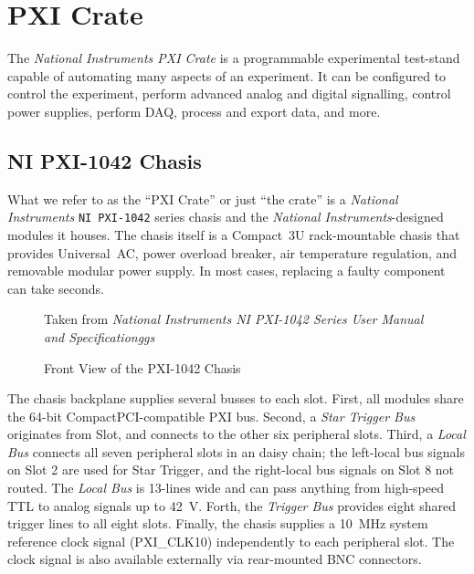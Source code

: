 \section{PXI Crate}
\label{sec:eq_pxi}

The \textit{National Instruments \gls{PXI Crate}} is a programmable experimental test-stand capable of automating many aspects of an experiment.  It can be configured to control the experiment, perform advanced analog and digital signalling, control power supplies, perform \gls{DAQ}, process and export data, and more.

\subsection{NI PXI-1042 Chasis}
\label{sec:eq_pxi:chasis}

What we refer to as the ``PXI Crate'' or just ``the crate'' is a \textit{National Instruments} \texttt{NI PXI-1042} series chasis and the \textit{National Instruments}-designed modules it houses.  The chasis itself is a Compact~3U rack-mountable chasis that provides Universal~AC, power overload breaker, air temperature regulation, and removable modular power supply.  In most cases, replacing a faulty component can take seconds.

\begin{figure}[htbp]
  \centering
  {\tiny
    Taken from \textit{National Instruments NI PXI-1042 Series User Manual and Specificationggs}
  }
  \caption{Front View of the PXI-1042 Chasis}
  \label{fig:eq_pxi:chasis_front}
\end{figure}

The chasis backplane supplies several busses to each slot.  First, all modules share the 64-bit CompactPCI-compatible PXI bus.  Second, a \textit{Star Trigger Bus} originates from Slot\pxislottwo, and connects to the other six peripheral slots.  Third, a \textit{Local Bus} connects all seven peripheral slots in an daisy chain; the left-local bus signals on Slot 2 are used for Star Trigger, and the right-local bus signals on Slot 8 not routed.  The \textit{Local Bus} is 13-lines wide and can pass anything from high-speed TTL to analog signals up to 42~V.  Forth, the \textit{Trigger Bus} provides eight shared trigger lines to all eight slots.  Finally, the chasis supplies a 10~MHz system reference clock signal (PXI\_CLK10) independently to each peripheral slot.  The clock signal is also available externally via rear-mounted BNC connectors.


